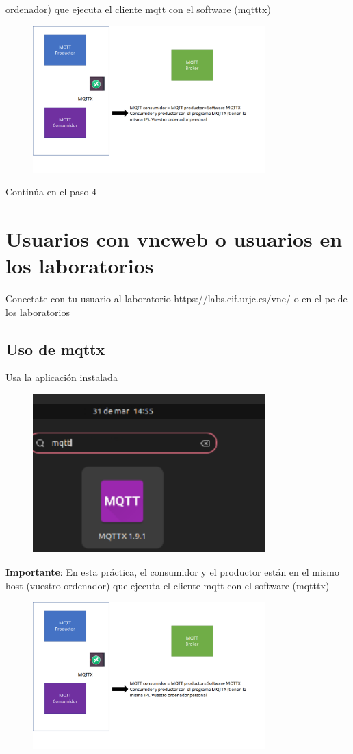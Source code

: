 \documentclass[12pt, a4paper]{report}
\begin{document}
ordenador) que ejecuta el cliente mqtt con el software (mqtttx)
\begin{figure}[H]
	\centering
	\includegraphics[width=0.8\textwidth]{enun3}
\end{figure}
Continúa en el paso 4
\chapter{Usuarios con vncweb o usuarios en los laboratorios}
Conectate con tu usuario al laboratorio https://labs.eif.urjc.es/vnc/ o en el pc de los laboratorios
\section{Uso de mqttx}
Usa la aplicación instalada
\begin{figure}[H]
	\centering
	\includegraphics[width=0.8\textwidth]{enun4}
\end{figure}
\textbf{Importante}: En esta práctica, el consumidor y el productor están en el mismo host (vuestro ordenador)
que ejecuta el cliente mqtt con el software (mqtttx)
\begin{figure}[H]
	\centering
	\includegraphics[width=0.8\textwidth]{enun5}
\end{figure}
\end{document}
